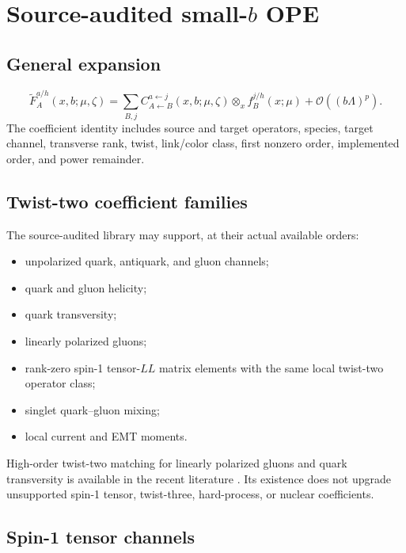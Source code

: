 \documentclass[11pt]{article}
\newcommand{\otimesx}{\mathbin{\otimes_x}}
\newcommand{\order}{\mathcal O}
\begin{document}
\section{Source-audited small-\texorpdfstring{\(b\)}{b} OPE}
\label{sec:ope}

\subsection{General expansion}

\begin{equation}
 \widetilde F_A^{a/h}(x,b;\mu,\zeta)
 =
 \sum_{B,j}
 C_{A\leftarrow B}^{a\leftarrow j}
 (x,b;\mu,\zeta)
 \otimesx
 f_B^{j/h}(x;\mu)
 +
 \order\!\left((b\Lambda)^p\right).
 \label{eq:small-b-ope}
\end{equation}
The coefficient identity includes source and target operators, species, target channel, transverse rank, twist, link/color class, first nonzero order, implemented order, and power remainder.

\subsection{Twist-two coefficient families}

The source-audited library may support, at their actual available orders:
\begin{itemize}
\item unpolarized quark, antiquark, and gluon channels;
\item quark and gluon helicity;
\item quark transversity;
\item linearly polarized gluons;
\item rank-zero spin-1 tensor-\(LL\) matrix elements with the same local twist-two operator class;
\item singlet quark--gluon mixing;
\item local current and EMT moments.
\end{itemize}
High-order twist-two matching for linearly polarized gluons and quark transversity is available in the recent literature \cite{ZhuLinearlyPolarized2025,ZhuTransversity2025}.  Its existence does not upgrade unsupported spin-1 tensor, twist-three, hard-process, or nuclear coefficients.

\subsection{Spin-1 tensor channels}
\end{document}

